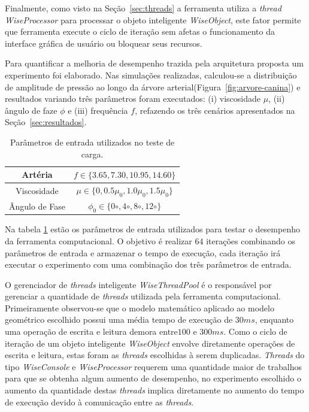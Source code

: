 Finalmente, como visto na Seção~\ref{sec:threads} a ferramenta utiliza a \textit{thread} \textit{WiseProcessor} para processar o objeto inteligente \textit{WiseObject}, este fator permite que ferramenta execute o ciclo de iteração sem afetas o funcionamento da interface gráfica de usuário ou bloquear seus recursos.

Para quantificar a melhoria de desempenho trazida pela arquitetura proposta um experimento foi elaborado. Nas simulações realizadas, calculou-se a distribuição de amplitude de pressão ao longo da árvore arterial(Figura~\ref{fig:arvore-canina}) e resultados variando três parâmetros foram executados: (i) viscosidade $\mu$, (ii) ângulo de faze $\phi$ e (iii) frequência $f$, refazendo os três cenários apresentados na Seção~\ref{sec:resultados}.

\begin{table}[!htbp]
	\caption{Parâmetros de entrada utilizados no teste de carga.}
	\centering{}
	\begin{tabular}{c|c}
		\toprule 
		Artéria	& $f \in \{3.65,7.30,10.95,14.60\}$  \\
		\midrule 
		Viscosidade	& $\mu \in \{0,0.5\mu_0,1.0\mu_0,1.5\mu_0\}$    \\ 
		\midrule 
		Ângulo de Fase	& $\phi_0 \in \{0{\circ},4{\circ},8{\circ},12{\circ}\}$  \\ 
		\bottomrule 
	\end{tabular} 
	\label{tab1:entrada}
\end{table}

Na tabela \ref{tab1:entrada} estão os parâmetros de entrada utilizados para testar o desempenho da ferramenta computacional. O objetivo é realizar $64$ iterações combinando os parâmetros de entrada e armazenar o tempo de execução, cada iteração irá executar o experimento com uma combinação dos três parâmetros de entrada.

O gerenciador de \textit{threads} inteligente \textit{WiseThreadPool} é o responsável por gerenciar a quantidade de \textit{threads} utilizada pela ferramenta computacional. Primeiramente observou-se que o modelo matemático aplicado ao modelo geométrico escolhido possui uma média tempo de execução de $30ms$, enquanto uma operação de escrita e leitura demora entre$100$ e $300ms$. Como o ciclo de iteração de um objeto inteligente \textit{WiseObject} envolve diretamente operações de escrita e leitura, estas foram as \textit{threads} escolhidas à serem duplicadas. \textit{Threads} do tipo \textit{WiseConsole} e \textit{WiseProcessor} requerem uma quantidade maior de trabalhos para que se obtenha algum aumento de desempenho, no experimento escolhido o aumento da quantidade destas \textit{threads} implica diretamente no aumento do tempo de execução devido à comunicação entre as \textit{threads}.


